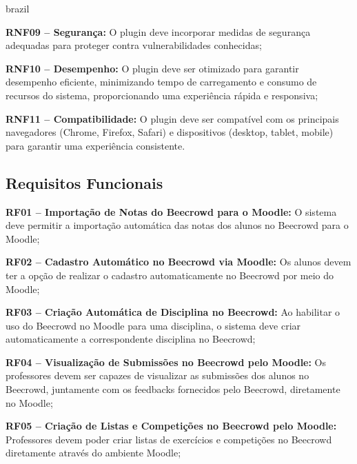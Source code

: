 \begin{otherlanguage*}{brazil}
\vspace{12pt}

\textbf{RNF09 – Segurança:} O plugin deve incorporar medidas de segurança adequadas para proteger contra vulnerabilidades conhecidas;

\vspace{12pt}

\textbf{RNF10 – Desempenho:} O plugin deve ser otimizado para garantir desempenho eficiente, minimizando tempo de carregamento e consumo de recursos do sistema, proporcionando uma experiência rápida e responsiva;

\vspace{12pt}

\textbf{RNF11 – Compatibilidade:} O plugin deve ser compatível com os principais navegadores (Chrome, Firefox, Safari) e dispositivos (desktop, tablet, mobile) para garantir uma experiência consistente.

\subsection{Requisitos Funcionais}

\textbf{RF01 – Importação de Notas do Beecrowd para o Moodle:} O sistema deve permitir a importação automática das notas dos alunos no Beecrowd para o Moodle;

\vspace{12pt}

\textbf{RF02 – Cadastro Automático no Beecrowd via Moodle:} Os alunos devem ter a opção de realizar o cadastro automaticamente no Beecrowd por meio do Moodle;

\vspace{12pt}

\textbf{RF03 – Criação Automática de Disciplina no Beecrowd:} Ao habilitar o uso do Beecrowd no Moodle para uma disciplina, o sistema deve criar automaticamente a correspondente disciplina no Beecrowd;

\vspace{12pt}

\textbf{RF04 – Visualização de Submissões no Beecrowd pelo Moodle:} Os professores devem ser capazes de visualizar as submissões dos alunos no Beecrowd, juntamente com os feedbacks fornecidos pelo Beecrowd, diretamente no Moodle;

\vspace{12pt}

\textbf{RF05 – Criação de Listas e Competições no Beecrowd pelo Moodle:} Professores devem poder criar listas de exercícios e competições no Beecrowd diretamente através do ambiente Moodle;


\end{otherlanguage*}

